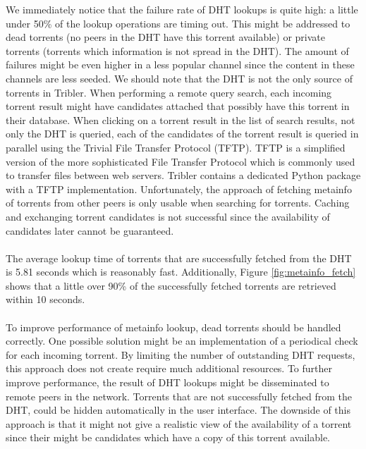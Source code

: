 We immediately notice that the failure rate of DHT lookups is quite high: a little under 50\% of the lookup operations are timing out. This might be addressed to dead torrents (no peers in the DHT have this torrent available) or private torrents (torrents which information is not spread in the DHT). The amount of failures might be even higher in a less popular channel since the content in these channels are less seeded. We should note that the DHT is not the only source of torrents in Tribler. When performing a remote query search, each incoming torrent result might have candidates attached that possibly have this torrent in their database. When clicking on a torrent result in the list of search results, not only the DHT is queried, each of the candidates of the torrent result is queried in parallel using the Trivial File Transfer Protocol (TFTP)\cite{sollins1992tftp}. TFTP is a simplified version of the more sophisticated File Transfer Protocol which is commonly used to transfer files between web servers. Tribler contains a dedicated Python package with a TFTP implementation. Unfortunately, the approach of fetching metainfo of torrents from other peers is only usable when searching for torrents. Caching and exchanging torrent candidates is not successful since the availability of candidates later cannot be guaranteed.\\\\
The average lookup time of torrents that are successfully fetched from the DHT is 5.81 seconds which is reasonably fast. Additionally, Figure \ref{fig:metainfo_fetch} shows that a little over 90\% of the successfully fetched torrents are retrieved within 10 seconds.\\\\
To improve performance of metainfo lookup, dead torrents should be handled correctly. One possible solution might be an implementation of a periodical check for each incoming torrent. By limiting the number of outstanding DHT requests, this approach does not create require much additional resources. To further improve performance, the result of DHT lookups might be disseminated to remote peers in the network. Torrents that are not successfully fetched from the DHT, could be hidden automatically in the user interface. The downside of this approach is that it might not give a realistic view of the availability of a torrent since their might be candidates which have a copy of this torrent available.

